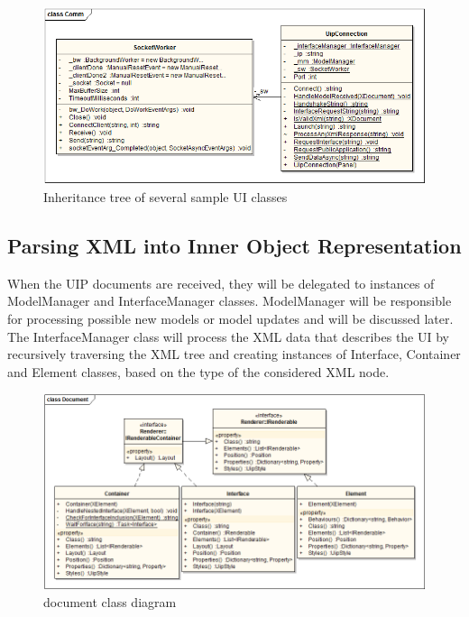 \begin{figure}[ht!]
\centering
\includegraphics[width=145mm]{pics/3/classComm.png}
\caption{Inheritance tree of several sample UI classes}
\label{fig:classComm}
\end{figure}

\subsection{Parsing XML into Inner Object Representation}
When the UIP documents are received, they will be delegated to instances of ModelManager and InterfaceManager classes. ModelManager will be responsible for processing possible new models or model updates and will be discussed later.\\
The InterfaceManager class will process the XML data that describes the UI by recursively traversing the XML tree and creating instances of Interface, Container and Element classes, based on the type of the considered XML node.

\begin{figure}[ht!]
\centering
\includegraphics[width=145mm]{pics/3/classDocument.png}
\caption{document class diagram}
\label{fig:classDocument}
\end{figure}

